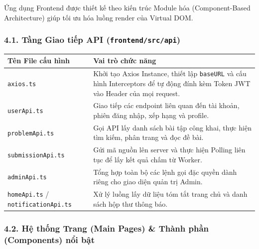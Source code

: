 \documentclass[12pt,a4paper]{article}
\renewcommand{\_}{\BreakableUnderscore}
\begin{document}
Ứng dụng Frontend được thiết kế theo kiến trúc Module hóa (Component-Based Architecture) giúp tối ưu hóa luồng render của Virtual DOM.

\subsubsection{\texorpdfstring{4.1. Tầng Giao tiếp API (\texttt{frontend/src/api})}{4.1. Tầng Giao tiếp API (frontend/src/api)}}

\begin{longtable}[]{
  |>{\raggedright\arraybackslash}p{}
  |>{\raggedright\arraybackslash}p{}|}
\hline\rowcolor{tableHeader}
\begin{minipage}[b]{\linewidth}\raggedright
Tên File cấu hình
\end{minipage} & \begin{minipage}[b]{\linewidth}\raggedright
Vai trò chức năng
\end{minipage} \\
\hline
\endhead
\hline
\endlastfoot
\texttt{axios.ts} & Khởi tạo Axios Instance, thiết lập \texttt{baseURL} và cấu hình Interceptors để tự động đính kèm Token JWT vào Header của mọi request. \\
\hline
\texttt{userApi.ts} & Giao tiếp các endpoint liên quan đến tài khoản, phiên đăng nhập, xếp hạng và profile. \\
\hline
\texttt{problemApi.ts} & Gọi API lấy danh sách bài tập công khai, thực hiện tìm kiếm, phân trang và đọc đề bài. \\
\hline
\texttt{submissionApi.ts} & Gửi mã nguồn lên server và thực hiện Polling liên tục để lấy kết quả chấm từ Worker. \\
\hline
\texttt{adminApi.ts} & Tổng hợp toàn bộ các lệnh gọi đặc quyền dành riêng cho giao diện quản trị Admin. \\
\hline
\texttt{homeApi.ts} / \texttt{notificationApi.ts} & Xử lý luồng lấy dữ liệu tóm tắt trang chủ và danh sách hộp thư thông báo. \\
\hline
\end{longtable}

\subsubsection{4.2. Hệ thống Trang (Main Pages) \& Thành phần (Components) nổi bật}
\end{document}
